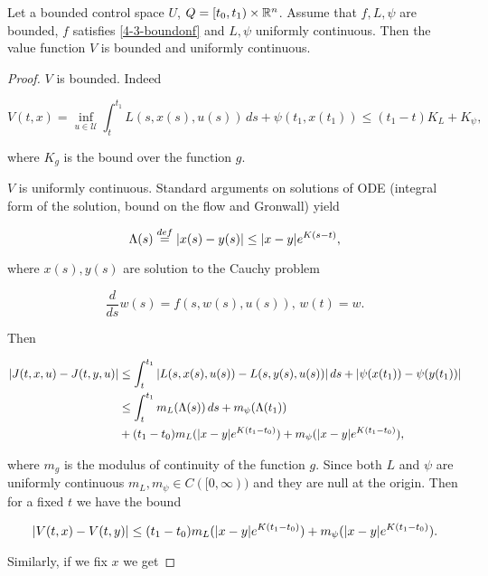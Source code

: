 \begin{theorem}\label{4-3-Theorem:1cont}
    Let a bounded control space $U$, $Q=[t_0,t_1)\times\mathbb{R}^n$. Assume that $f,L,\psi$ are bounded, $f$ satisfies \ref{4-3-boundonf} and $L,\psi$ uniformly continuous. 
    Then the value function $V$ is bounded and uniformly continuous.
    
    \begin{proof}
        $V$ is bounded. Indeed 

        \[V(t,x) = \inf_{u\in\mathcal{U}}\int_t^{t_1} L(s,x(s),u(s))\,ds + \psi(t_1,x(t_1)) \leq (t_1-t)K_L + K_{\psi},\]

        where $K_g$ is the bound over the function $g$. 

        $V$ is uniformly continuous. Standard arguments on solutions of ODE (integral form of the solution, bound on the flow and Gronwall) yield 

        \begin{equation}
            \Lambda(s) \overset{def}{=} \abs{x(s)-y(s)} \leq \abs{x-y}e^{K(s-t)},
        \end{equation} 

        where $x(s),y(s)$ are solution to the Cauchy problem

        \[\frac{d}{ds}w(s) = f(s,w(s),u(s)),\, w(t)=w.\]

        Then

        \begin{align*}
            \abs{J(t,x,u) - J(t,y,u)} & \leq \int_t^{t_1} \abs{L(s,x(s),u(s)) - L(s,y(s), u(s))}\,ds + \abs{\psi(x(t_1)) - \psi(y(t_1))} \\
            & \leq \int_t^{t_1} m_L(\Lambda(s))\,ds + m_{\psi}(\Lambda(t_1)) \\
            & + (t_1-t_0)m_L(\abs{x-y}e^{K(t_1-t_0)}) + m_{\psi}(\abs{x-y}e^{K(t_1-t_0)}),
        \end{align*}

        where $m_g$ is the modulus of continuity of the function $g$. Since both $L$ and $\psi$ are uniformly continuous $m_L,m_{\psi}\in C([0,\infty))$ and 
        they are null at the origin. Then for a fixed $t$ we have the bound
        
        \begin{equation}\label{4-3-InProof:modulust}
            \abs{V(t,x)-V(t,y)} \leq (t_1-t_0)m_L(\abs{x-y}e^{K(t_1-t_0)}) + m_{\psi}(\abs{x-y}e^{K(t_1-t_0)}).
        \end{equation}

        Similarly, if we fix $x$ we get 


\end{proof}
\end{theorem}
